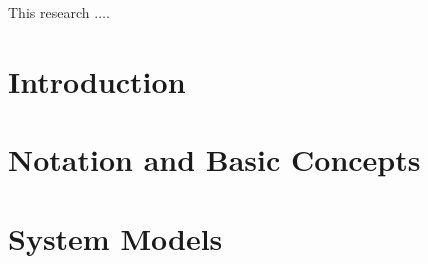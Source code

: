 \documentclass[12pt,letterpaper]{lsuetdmod}
\numberwithin{thm}{chapter}
\numberwithin{lem}{chapter}
\numberwithin{cor}{chapter}
\numberwithin{defn}{chapter}
\numberwithin{cond}{chapter}
\numberwithin{rmk}{chapter}
\begin{document}


\cleardoublepage{}
\renewenvironment{abstract}{{\hspace{-2.2em} \Large \textbf{\abstractname}} \par}{\pagebreak} %


\begin{abstract}
\vspace{0.55ex}
\doublespacing
This research $\ldots$.


\end{abstract}

\singlespacing
\setlength{\textfloatsep}{12pt plus 2pt minus 2pt}
\setlength{\intextsep}{6pt plus 2pt minus 2pt}


\chapter{Introduction} \label{ch:intro}
\doublespacing

\pagebreak
\singlespacing


\chapter{Notation and Basic Concepts} \label{ch:notation-concepts}
\doublespacing

\pagebreak
\singlespacing


\chapter{System Models} \label{ch:system-model}
\doublespacing
%
\pagebreak
\singlespacing
\end{document}
